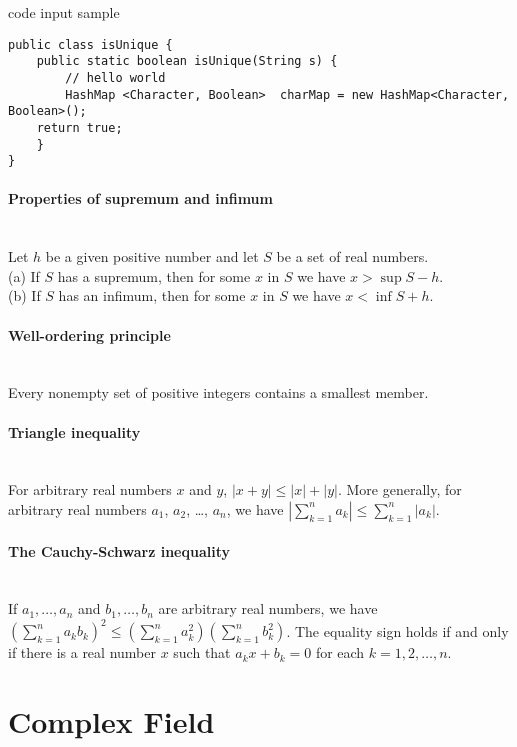 \documentclass[10pt]{article}
\begin{document}
\newpage
\noindent\makebox[\linewidth]{\rule{\paperwidth}{0.4pt}}

code input sample
\begin{lstlisting}[frame=single]
public class isUnique {
	public static boolean isUnique(String s) {
		// hello world
		HashMap <Character, Boolean>  charMap = new HashMap<Character, Boolean>();
	return true;
	}
}
\end{lstlisting}


\paragraph{Properties of supremum and infimum}\ \\
Let $h$ be a given positive number and let $S$ be a set of real numbers.\\ 
(a) If $S$ has a supremum, then for some $x$ in $S$ we have $x > \sup S - h$.\\
(b) If $S$ has an infimum, then for some $x$ in $S$ we have $x < \inf S + h$.

\paragraph{Well-ordering principle}\ \\
Every nonempty set of positive integers contains a smallest member.

\paragraph{Triangle inequality}\ \\
For arbitrary real numbers $x$ and $y$, 
$|x + y| \leq |x| + |y|.$
More generally, for arbitrary real numbers $a_1$, $a_2$, \ldots, $a_n$, we have
$\left|\sum_{k=1}^n a_k\right| \leq \sum_{k=1}^n |a_k|.$

\paragraph{The Cauchy-Schwarz inequality}\ \\
If $a_1, \ldots, a_n$ and $b_1, \ldots, b_n$ are arbitrary real numbers, we have
$\left( \sum_{k=1}^n a_k b_k \right)^2 \leq \left( \sum_{k=1}^n a_k^2 \right) \left( \sum_{k=1}^n b_k^2 \right)$.
The equality sign holds if and only if there is a real number $x$ such that $a_k x + b_k = 0$
for each $k = 1, 2, \ldots, n$.



\bigskip\bigskip
\section{Complex Field}\smallskip
\end{document}
